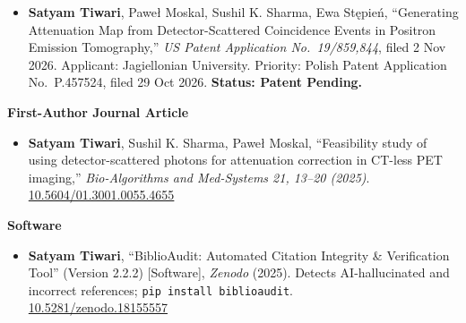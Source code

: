 \noindent {}
\begin{itemize}
\item \textbf{Satyam Tiwari}, Pawe{\l} Moskal, Sushil K. Sharma, Ewa St{\k{e}}pie{\'n}, ``Generating Attenuation Map from Detector-Scattered Coincidence Events in Positron Emission Tomography,'' \emph{US Patent Application No.\ 19/859,844}, filed 2 Nov 2026. Applicant: Jagiellonian University. Priority: Polish Patent Application No.\ P.457524, filed 29 Oct 2026. \textbf{Status: Patent Pending.}
\end{itemize}

\noindent {}

\textcolor{accentblue}{\textbf{First-Author Journal Article}}
\begin{itemize}
\item \textbf{Satyam Tiwari}, Sushil K. Sharma, Pawe{\l} Moskal, ``Feasibility study of using detector-scattered photons for attenuation correction in CT-less PET imaging,'' \emph{Bio-Algorithms and Med-Systems 21, 13--20 (2025)}.\\
\href{https://doi.org/10.5604/01.3001.0055.4655}{10.5604/01.3001.0055.4655}
\end{itemize}

\textcolor{accentblue}{\textbf{Software}}
\begin{itemize}
\item \textbf{Satyam Tiwari}, ``BiblioAudit: Automated Citation Integrity \& Verification Tool'' (Version 2.2.2) [Software], \emph{Zenodo} (2025). Detects AI-hallucinated and incorrect references; \texttt{pip install biblioaudit}.\\
\href{https://doi.org/10.5281/zenodo.18155557}{10.5281/zenodo.18155557}
\end{itemize}

